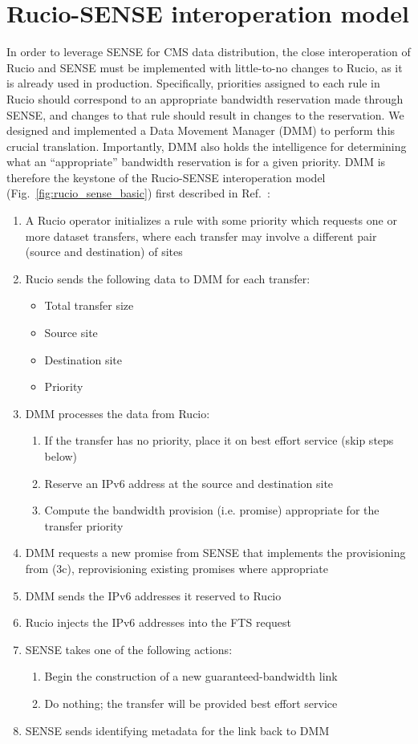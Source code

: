 \section{Rucio-SENSE interoperation model}
In order to leverage SENSE for CMS data distribution, the close interoperation of Rucio and SENSE must be implemented with little-to-no changes to Rucio, as it is already used in production. 
Specifically, priorities assigned to each rule in Rucio should correspond to an appropriate bandwidth reservation made through SENSE, and changes to that rule should result in changes to the reservation. 
We designed and implemented a Data Movement Manager (DMM) to perform this crucial translation. 
Importantly, DMM also holds the intelligence for determining what an ``appropriate'' bandwidth reservation is for a given priority. 
DMM is therefore the keystone of the Rucio-SENSE interoperation model (Fig.~\ref{fig:rucio_sense_basic}) first described in Ref.~\cite{Guiang:2022tgi}:
\begin{enumerate}
    \item A Rucio operator initializes a rule with some priority which requests one or more dataset transfers, where each transfer may involve a different pair (source and destination) of sites
    \item Rucio sends the following data to DMM for each transfer:
    \begin{itemize}
        \item Total transfer size
        \item Source site
        \item Destination site
        \item Priority
    \end{itemize}
    \item DMM processes the data from Rucio:
    \begin{enumerate}
        \item If the transfer has no priority, place it on best effort service (skip steps below)
        \item Reserve an IPv6 address at the source and destination site
        \item Compute the bandwidth provision (i.e. promise) appropriate for the transfer priority
    \end{enumerate}
    \item DMM requests a new promise from SENSE that implements the provisioning from (3c), reprovisioning existing promises where appropriate
    \item DMM sends the IPv6 addresses it reserved to Rucio
    \item Rucio injects the IPv6 addresses into the FTS request
    \item SENSE takes one of the following actions:
    \begin{enumerate}
        \item Begin the construction of a new guaranteed-bandwidth link
        \item Do nothing; the transfer will be provided best effort service
    \end{enumerate}
    \item SENSE sends identifying metadata for the link back to DMM
\end{enumerate}
